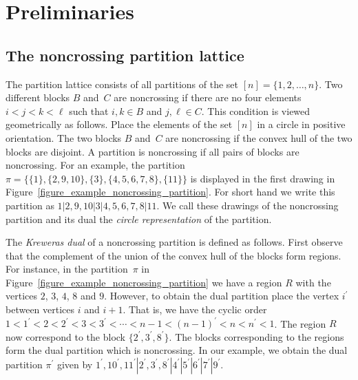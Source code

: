 \documentclass[11pt]{amsart}
\numberwithin{equation}{section}
\begin{document}
\section{Preliminaries}
\label{section_Preliminaries}

\subsection{The noncrossing partition lattice}
\label{subsection_The_noncrossing_partition_lattice}

The partition lattice consists of all partitions of
the set $[n] = \{1,2, \ldots, n\}$.
Two different blocks $B$ and~$C$ are noncrossing if there are no four
elements $i < j < k < \ell$ such that $i,k \in B$ and $j,\ell \in C$.
This condition is viewed geometrically as follows. Place the elements of the set $[n]$
in a circle in positive orientation. The two blocks $B$ and~$C$ are noncrossing
if the convex hull of the two blocks are disjoint.
A partition is noncrossing if all pairs of blocks are noncrossing.
For an example,
the partition
$\pi = \{\{1\}, \{2,9,10\}, \{3\}, \{4,5,6,7,8\}, \{11\}\}$
is displayed in the first drawing in
Figure~\ref{figure_example_noncrossing_partition}.
For short hand we write this partition as
$1|2,9,10|3|4,5,6,7,8|11$.
We call these drawings of the noncrossing partition and its dual
the {\em circle representation} of the partition.


The {\em Kreweras dual} of a noncrossing partition is defined as follows.
First observe that the complement of the union of the convex hull of the blocks
form regions. For instance,
in the partition~$\pi$ in
Figure~\ref{figure_example_noncrossing_partition}
we have a region $R$ with the vertices $2$, $3$, $4$, $8$ and $9$.
However, to obtain the dual partition place the vertex $i^{\prime}$
between vertices $i$ and $i+1$.
That is, we have the cyclic order
$1 < 1^{\prime} <
2 < 2^{\prime} <
3 < 3^{\prime} <
\cdots <
n-1 < (n-1)^{\prime} <
n < n^{\prime} < 1$.
The region $R$ now correspond to the block
$\{2^{\prime},3^{\prime},8^{\prime}\}$.
The blocks corresponding to the regions form the dual partition
which is noncrossing. In our example, we obtain
the dual partition $\pi^{\prime}$ given by
$1^{\prime},10^{\prime},11^{\prime}|2^{\prime},3^{\prime},8^{\prime}|4^{\prime}|5^{\prime}|6^{\prime}|7^{\prime}|9^{\prime}$.
\end{document}
